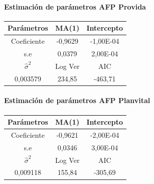 \paragraph{Estimaci\'on de par\'ametros AFP Provida}
\begin{center}
\begin{tabular}{|l|l|l|}
\hline
\multicolumn{1}{|c|}{Par\'ametros} & \multicolumn{1}{c|}{MA(1)} & \multicolumn{1}{c|}{Intercepto} \\
\hline
\multicolumn{1}{|c|}{Coeficiente} & \multicolumn{1}{c|}{-0,9629} & \multicolumn{1}{c|}{-1,00E-04} \\
\hline
\multicolumn{1}{|c|}{s.e} & \multicolumn{1}{c|}{0,0379} & \multicolumn{1}{c|}{2,00E-04} \\
\hline
\multicolumn{1}{|c|}{$\hat{\sigma}^{2}$} & \multicolumn{1}{c|}{Log Ver} & \multicolumn{1}{c|}{AIC} \\
\hline
\multicolumn{1}{|c|}{0,003579} & \multicolumn{1}{c|}{234,85} & \multicolumn{1}{c|}{-463,71} \\
\hline
\end{tabular}
\end{center}
\paragraph{Estimaci\'on de par\'ametros AFP Planvital}
\begin{center}
\begin{tabular}{|l|l|l|}
\hline
\multicolumn{1}{|c|}{Par\'ametros} & \multicolumn{1}{c|}{MA(1)} & \multicolumn{1}{c|}{Intercepto} \\
\hline
\multicolumn{1}{|c|}{Coeficiente} & \multicolumn{1}{c|}{-0,9621} & \multicolumn{1}{c|}{-2,00E-04} \\
\hline
\multicolumn{1}{|c|}{s.e} & \multicolumn{1}{c|}{0,0346} & \multicolumn{1}{c|}{3,00E-04} \\
\hline
\multicolumn{1}{|c|}{$\hat{\sigma}^{2}$} & \multicolumn{1}{c|}{Log Ver} & \multicolumn{1}{c|}{AIC} \\
\hline
\multicolumn{1}{|c|}{0,009118} & \multicolumn{1}{c|}{155,84} & \multicolumn{1}{c|}{-305,69} \\
\hline
\end{tabular}
\end{center}
